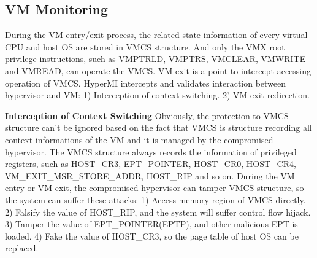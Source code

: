 \documentclass[conference]{IEEEtran}
\begin{document}

\subsection{VM Monitoring}

During the VM entry/exit process, the related state information of every virtual CPU and host OS are stored in VMCS structure. 
And only the VMX root privilege instructions, such as VMPTRLD, VMPTRS, VMCLEAR, VMWRITE and VMREAD, can operate the VMCS.
VM exit is a point to intercept accessing operation of VMCS. HyperMI intercepts and validates interaction between hypervisor and VM: 1) Interception of context switching. 2) VM exit redirection.

\textbf{Interception of Context Switching}
Obviously, the protection to VMCS structure can't be ignored based on the fact that VMCS is structure recording all context informations of the VM and it is managed by the compromised hypervisor. 
The VMCS structure always records the information of privileged registers, such as HOST\_CR3, EPT\_POINTER, HOST\_CR0, HOST\_CR4, VM\_EXIT\_MSR\_STORE\_ADDR, HOST\_RIP and so on. During the VM entry or VM exit, the compromised hypervisor can tamper VMCS structure, so the system can suffer these attacks: 1) Access memory region of VMCS directly. 2) Falsify the value of HOST\_RIP, and the system will suffer control flow hijack. 3) Tamper the value of EPT\_POINTER(EPTP), and other malicious EPT is loaded. 4) Fake the value of HOST\_CR3, so the page table of host OS can be replaced.
\end{document}
